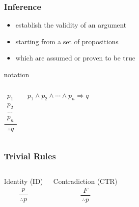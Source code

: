 \documentclass[dvipsnames]{beamer}
\begin{document}
\begin{frame}
  \frametitle{Inference}

  \begin{itemize}
    \item establish the validity of an argument
    \item starting from a set of propositions
    \item which are assumed or proven to be true
  \end{itemize}

  \pause
  \begin{block}{notation}
    \begin{columns}
      \[
      \frac
        {
          \begin{array}{c}
            p_1\\
            p_2\\
            \dots\\
            p_n
          \end{array}
        }
        {
          \therefore q
        }
      \]

      $p_1 \wedge p_2 \wedge \cdots \wedge p_n \Rightarrow q$
    \end{columns}
  \end{block}
\end{frame}

\begin{frame}
  \frametitle{Trivial Rules}

  \begin{columns}
    \begin{block}{Identity (ID)}
      \[
      \frac
        {
          \begin{array}{c}
            p
          \end{array}
        }
        {
          \therefore p
        }
      \]
    \end{block}

    \pause
    \begin{block}{Contradiction (CTR)}
    \[
    \frac
      {
        \begin{array}{c}
          F
        \end{array}
      }
      {
        \therefore p
      }
    \]
    \end{block}
  \end{columns}
\end{frame}
\end{document}
